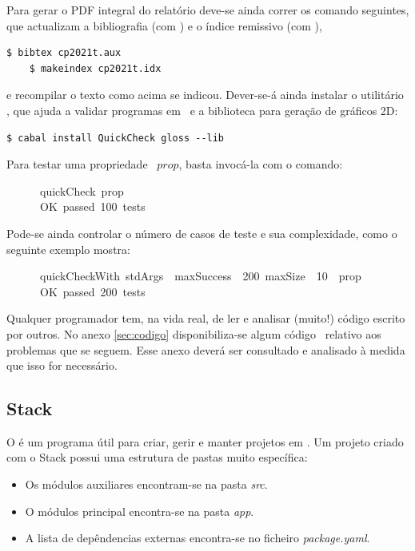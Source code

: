 \documentclass[a4paper]{article}
\newcommand{\Varid}[1]{\mathit{#1}}
\begin{document}
Para gerar o PDF integral do relatório deve-se ainda correr os comando seguintes,
que actualizam a bibliografia (com \Bibtex) e o índice remissivo (com \Makeindex),
\begin{Verbatim}[fontsize=\small]
    $ bibtex cp2021t.aux
    $ makeindex cp2021t.idx
\end{Verbatim}
e recompilar o texto como acima se indicou. Dever-se-á ainda instalar o utilitário
\QuickCheck,
que ajuda a validar programas em \Haskell\ e a biblioteca  para
geração de gráficos 2D:
\begin{Verbatim}[fontsize=\small]
    $ cabal install QuickCheck gloss --lib
\end{Verbatim}
Para testar uma propriedade \QuickCheck~\ensuremath{\Varid{prop}}, basta invocá-la com o comando:
\begin{tabbing}\ttfamily
~~~~~~quickCheck~prop\\
\ttfamily ~~~~~~OK~passed~100~tests
\end{tabbing}
Pode-se ainda controlar o número de casos de teste e sua complexidade,
como o seguinte exemplo mostra:
\begin{tabbing}\ttfamily
~~~~~~quickCheckWith~stdArgs~~maxSuccess~~200~maxSize~~10~~prop\\
\ttfamily ~~~~~~OK~passed~200~tests
\end{tabbing}
Qualquer programador tem, na vida real, de ler e analisar (muito!) código
escrito por outros. No anexo \ref{sec:codigo} disponibiliza-se algum
código \Haskell\ relativo aos problemas que se seguem. Esse anexo deverá
ser consultado e analisado à medida que isso for necessário.

\subsection{Stack}

O  é um programa útil para criar, gerir e manter projetos em \Haskell.
Um projeto criado com o Stack possui uma estrutura de pastas muito específica:

\begin{itemize}
\item Os módulos auxiliares encontram-se na pasta \emph{src}.
\item O módulos principal encontra-se na pasta \emph{app}.
\item A lista de depêndencias externas encontra-se no ficheiro \emph{package.yaml}.
\end{itemize}
\end{document}
